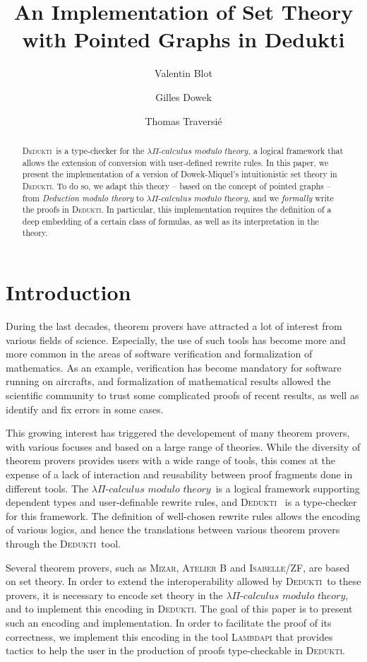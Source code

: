 \documentclass[submission,copyright,creativecommons]{eptcs}
\title{An Implementation of Set Theory with Pointed Graphs in Dedukti}
\author{Valentin Blot
\institute{Inria, France\\
LMF, ENS Paris-Saclay, France}
\email{valentin.blot@inria.fr}
\and
Gilles Dowek
\institute{Inria, France\\
LMF, ENS Paris-Saclay, France}
\email{gilles.dowek@ens-paris-saclay.fr}
\and
Thomas Traversié
\institute{CentraleSupélec, France}
\email{thomas.traversie@inria.fr}
}
\newcommand{\dedukti}{\textsc{Dedukti}}
\newcommand{\lpcm}{$\lambda \Pi\textit{-calculus modulo theory}$}
\begin{document}
\maketitle

\begin{abstract}
\dedukti ~is a type-checker for the \lpcm, a logical framework that allows the extension of conversion with user-defined rewrite rules. In this paper, we present the implementation of a version of Dowek-Miquel's intuitionistic set theory in \dedukti. To do so, we adapt this theory -- based on the concept of pointed graphs -- from \textit{Deduction modulo theory} to \lpcm, and we \textit{formally} write the proofs in \dedukti. In particular, this implementation requires the definition of a deep embedding of a certain class of formulas, as well as its interpretation in the theory.
\end{abstract}

\section{Introduction}

During the last decades, theorem provers have attracted a lot of interest from various fields of science. Especially, the use of such tools has become more and more common in the areas of software verification and formalization of mathematics. As an example, verification has become mandatory for software running on aircrafts, and formalization of mathematical results allowed the scientific community to trust some complicated proofs of recent results, as well as identify and fix errors in some cases.

This growing interest has triggered the developement of many theorem provers, with various focuses and based on a large range of theories. While the diversity of theorem provers provides users with a wide range of tools, this comes at the expense of a lack of interaction and reusability between proof fragments done in different tools. The \lpcm ~is a logical framework supporting dependent types and user-definable rewrite rules, and \dedukti ~\cite{expressing} is a type-checker for this framework. The definition of well-chosen rewrite rules allows the encoding of various logics, and hence the translations between various theorem provers through the \dedukti ~tool.

Several theorem provers, such as \textsc{Mizar}, \textsc{Atelier B} and \textsc{Isabelle/ZF}, are based on set theory. In order to extend the interoperability allowed by \dedukti ~to these provers, it is necessary to encode set theory in the \lpcm, and to implement this encoding in \dedukti. The goal of this paper is to present such an encoding and implementation. In order to facilitate the proof of its correctness, we implement this encoding in the tool \textsc{Lambdapi} that provides tactics to help the user in the production of proofs type-checkable in \dedukti.
\end{document}
